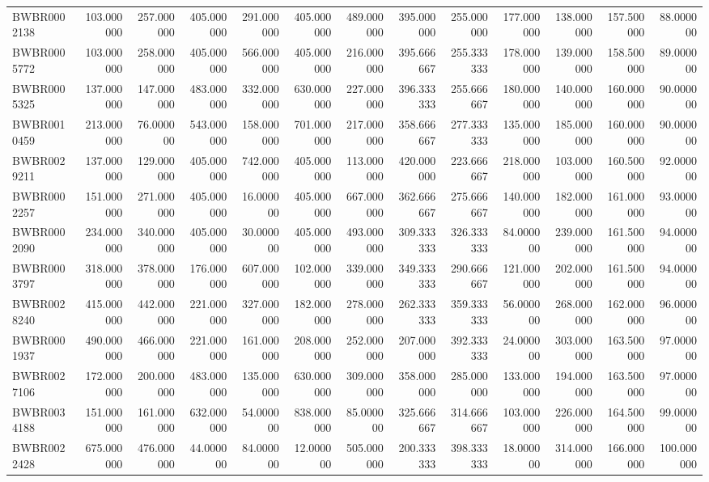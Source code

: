 \begin{longtable}{lrrrrrrrrrrrr}
BWBR0002138 & 103.000000 & 257.000000 & 405.000000 & 291.000000 & 405.000000 & 489.000000 & 395.000000 & 255.000000 & 177.000000 & 138.000000 & 157.500000 & 88.000000 \\
BWBR0005772 & 103.000000 & 258.000000 & 405.000000 & 566.000000 & 405.000000 & 216.000000 & 395.666667 & 255.333333 & 178.000000 & 139.000000 & 158.500000 & 89.000000 \\
BWBR0005325 & 137.000000 & 147.000000 & 483.000000 & 332.000000 & 630.000000 & 227.000000 & 396.333333 & 255.666667 & 180.000000 & 140.000000 & 160.000000 & 90.000000 \\
BWBR0010459 & 213.000000 & 76.000000 & 543.000000 & 158.000000 & 701.000000 & 217.000000 & 358.666667 & 277.333333 & 135.000000 & 185.000000 & 160.000000 & 90.000000 \\
BWBR0029211 & 137.000000 & 129.000000 & 405.000000 & 742.000000 & 405.000000 & 113.000000 & 420.000000 & 223.666667 & 218.000000 & 103.000000 & 160.500000 & 92.000000 \\
BWBR0002257 & 151.000000 & 271.000000 & 405.000000 & 16.000000 & 405.000000 & 667.000000 & 362.666667 & 275.666667 & 140.000000 & 182.000000 & 161.000000 & 93.000000 \\
BWBR0002090 & 234.000000 & 340.000000 & 405.000000 & 30.000000 & 405.000000 & 493.000000 & 309.333333 & 326.333333 & 84.000000 & 239.000000 & 161.500000 & 94.000000 \\
BWBR0003797 & 318.000000 & 378.000000 & 176.000000 & 607.000000 & 102.000000 & 339.000000 & 349.333333 & 290.666667 & 121.000000 & 202.000000 & 161.500000 & 94.000000 \\
BWBR0028240 & 415.000000 & 442.000000 & 221.000000 & 327.000000 & 182.000000 & 278.000000 & 262.333333 & 359.333333 & 56.000000 & 268.000000 & 162.000000 & 96.000000 \\
BWBR0001937 & 490.000000 & 466.000000 & 221.000000 & 161.000000 & 208.000000 & 252.000000 & 207.000000 & 392.333333 & 24.000000 & 303.000000 & 163.500000 & 97.000000 \\
BWBR0027106 & 172.000000 & 200.000000 & 483.000000 & 135.000000 & 630.000000 & 309.000000 & 358.000000 & 285.000000 & 133.000000 & 194.000000 & 163.500000 & 97.000000 \\
BWBR0034188 & 151.000000 & 161.000000 & 632.000000 & 54.000000 & 838.000000 & 85.000000 & 325.666667 & 314.666667 & 103.000000 & 226.000000 & 164.500000 & 99.000000 \\
BWBR0022428 & 675.000000 & 476.000000 & 44.000000 & 84.000000 & 12.000000 & 505.000000 & 200.333333 & 398.333333 & 18.000000 & 314.000000 & 166.000000 & 100.000000 \\

\end{longtable}
